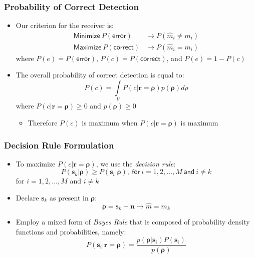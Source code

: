 \documentclass[10pt]{beamer}
\begin{document}
\frame
{
  \frametitle{Probability of Correct Detection}

    \begin{itemize}
        \item Our criterion for the receiver is:
        \begin{equation}
        \begin{split}
            \mathsf{Minimize}~P(\mathsf{error})&\rightarrow{P(\hat{m}_i\neq{m_i})}\\
            \mathsf{Maximize}~P(\mathsf{correct})&\rightarrow{P(\hat{m}_i={m_i})}
        \end{split}
        \end{equation}
        where $P(e)=P(\mathsf{error})$, $P(c)=P(\mathsf{correct})$, and $P(e)=1-P(c)$
        \item The overall probability of correct detection is equal to:
        \begin{equation}
            P(c)=\int\limits_VP(c|\mathbf{r}=\mathbf{\rho})p(\mathbf{\rho})d\rho
        \end{equation}
        where $P(c|\mathbf{r}=\mathbf{\rho})\ge{0}$ and $p(\mathbf{\rho})\ge{0}$
        \begin{itemize}
            \item Therefore $P(c)$ is maximum when $P(c|\mathbf{r}=\mathbf{\rho})$ is maximum
        \end{itemize}
    \end{itemize}
}
\frame
{
  \frametitle{Decision Rule Formulation}
  
    \begin{itemize}
        \item To maximize $P(c|\mathbf{r}=\mathbf{\rho})$, we use the {\it decision rule}:
        \begin{equation}
            P(\mathbf{s}_k|\mathbf{\rho})\ge{P(\mathbf{s}_i|\mathbf{\rho})},~\mathsf{for}~i=1,2,\ldots,M~\mathsf{and}~i\neq{k}
        \end{equation}
        for $i=1,2,\ldots,M$ and $i\neq{k}$
        \item Declare $\mathbf{s}_k$ as present in $\mathbf{\rho}$:
        \begin{equation}
            \mathbf{\rho}=\mathbf{s}_k+\mathbf{n}\rightarrow\hat{m}=m_k
        \end{equation}
        \item Employ a mixed form of {\it Bayes Rule} that is composed of probability density functions and probabilities, namely:
        \begin{equation}
            P(\mathbf{s}_i|\mathbf{r}=\mathbf{\rho})=\frac{p(\mathbf{\rho}|\mathbf{s}_i)P(\mathbf{s}_i)}{p(\mathbf{\rho})}
        \end{equation}
    \end{itemize}
    
}
\end{document}
